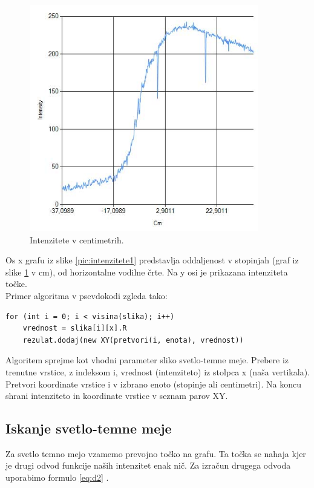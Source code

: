 \documentclass[oneside, a4paper, 12pt]{book}
\begin{document}
\begin{figure}
\begin{center}
\includegraphics[width=10cm]{slike/intenzitete-v-cm.jpg}
\end{center}
\caption{Intenzitete v centimetrih.}
\label{pic:intenzitete2}
\end{figure}

Os x grafu iz slike \ref{pic:intenzitete1} predstavlja oddaljenost v stopinjah (graf iz slike \ref{pic:intenzitete2} v cm), od horizontalne vodilne črte. Na y osi je prikazana intenziteta točke. \\ 
Primer algoritma v psevdokodi zgleda tako:


\begin{verbatim}
for (int i = 0; i < visina(slika); i++)
    vrednost = slika[i][x].R
    rezulat.dodaj(new XY(pretvori(i, enota), vrednost))
\end{verbatim}

Algoritem sprejme kot vhodni parameter sliko svetlo-temne meje. Prebere iz trenutne vrstice, z indeksom i, vrednost (intenziteto) iz stolpca x (naša vertikala). Pretvori koordinate vrstice i v izbrano enoto (stopinje ali centimetri). Na koncu shrani intenziteto in koordinate vrstice v seznam parov XY.

\subsection{Iskanje svetlo-temne meje}
Za svetlo temno mejo vzamemo prevojno točko na grafu. Ta točka se nahaja kjer je drugi odvod funkcije naših intenzitet enak nič. Za izračun drugega odvoda uporabimo formulo \ref{eq:d2} \cite{second-d}.
\end{document}
